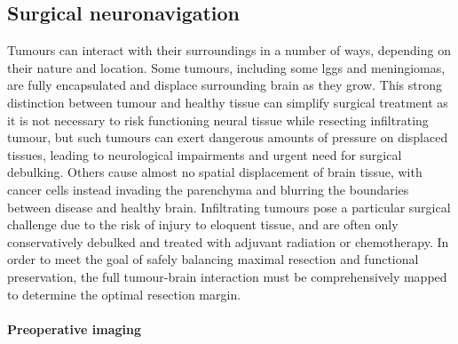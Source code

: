 \subsection{Surgical neuronavigation}


Tumours can interact with their surroundings in a number of ways, depending on their nature and location.
Some tumours, including some \glspl{lgg} and meningiomas, are fully encapsulated and displace surrounding brain as they grow.
This strong distinction between tumour and healthy tissue can simplify surgical treatment as it is not necessary to risk functioning neural tissue while resecting infiltrating tumour, but such tumours can exert dangerous amounts of pressure on displaced tissues, leading to neurological impairments and urgent need for surgical debulking.
Others cause almost no spatial displacement of brain tissue, with cancer cells instead invading the parenchyma and blurring the boundaries between disease and healthy brain.
Infiltrating tumours pose a particular surgical challenge due to the risk of injury to eloquent tissue, and are often only conservatively debulked and treated with adjuvant radiation or chemotherapy.
In order to meet the goal of safely balancing maximal resection and functional preservation, the full tumour-brain interaction must be comprehensively mapped to determine the optimal resection margin.

\paragraph*{Preoperative imaging}


